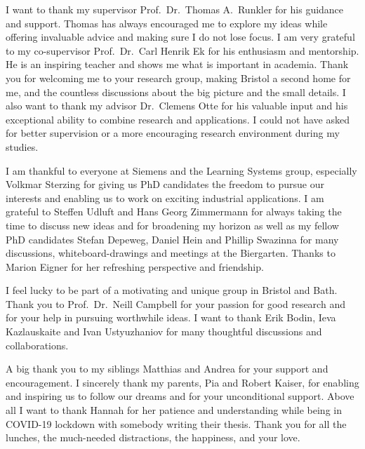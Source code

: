 \begin{Acknowledgements}
    I want to thank my supervisor Prof.~Dr.~Thomas A.~Runkler for his guidance and support.
    Thomas has always encouraged me to explore my ideas while offering invaluable advice and making sure I do not lose focus.
    I am very grateful to my co-supervisor Prof.~Dr.~Carl Henrik Ek for his enthusiasm and mentorship.
    He is an inspiring teacher and shows me what is important in academia.
    Thank you for welcoming me to your research group, making Bristol a second home for me, and the countless discussions about the big picture and the small details.
    I also want to thank my advisor Dr.~Clemens Otte for his valuable input and his exceptional ability to combine research and applications.
    I could not have asked for better supervision or a more encouraging research environment during my studies.

    I am thankful to everyone at Siemens and the Learning Systems group, especially Volkmar Sterzing for giving us PhD candidates the freedom to pursue our interests and enabling us to work on exciting industrial applications.
    I am grateful to Steffen Udluft and Hans Georg Zimmermann for always taking the time to discuss new ideas and for broadening my horizon as well as my fellow PhD candidates Stefan Depeweg, Daniel Hein and Phillip Swazinna for many discussions, whiteboard-drawings and meetings at the Biergarten.
    Thanks to Marion Eigner for her refreshing perspective and friendship.

    I feel lucky to be part of a motivating and unique group in Bristol and Bath.
    Thank you to Prof.~Dr.~Neill Campbell for your passion for good research and for your help in pursuing worthwhile ideas.
    I want to thank Erik Bodin, Ieva Kazlauskaite and Ivan Ustyuzhaniov for many thoughtful discussions and collaborations.

    A big thank you to my siblings Matthias and Andrea for your support and encouragement.
    I sincerely thank my parents, Pia and Robert Kaiser, for enabling and inspiring us to follow our dreams and for your unconditional support.
    Above all I want to thank Hannah for her patience and understanding while being in COVID-19 lockdown with somebody writing their thesis.
    Thank you for all the lunches, the much-needed distractions, the happiness, and your love.
\end{Acknowledgements}

\listoftodos
\todototoc

\tableofcontents
